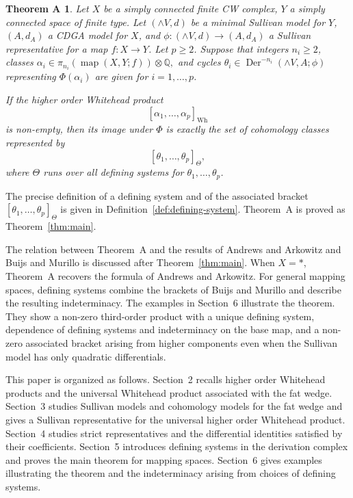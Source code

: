 \documentclass[a4paper,10pt]{amsart}
\newtheorem*{thmA}{Theorem A}
\theoremstyle{definition}
\theoremstyle{remark}
\newcommand{\map}{\operatorname{map}}
\newcommand{\Der}{\operatorname{Der}}
\numberwithin{equation}{section}
\begin{document}
\begin{thmA}
Let $X$ be a simply connected finite CW complex, $Y$ a simply connected
space of finite type. Let $(\wedge V,d)$ be a minimal Sullivan model for $Y$,
$(A,d_A)$ a CDGA model for $X$, and
$
        \phi:(\wedge V,d)\to (A,d_A)
$
a Sullivan representative for a map $f:X\to Y$.
Let $p\geq2$. Suppose that integers $n_i\geq2$, classes
$
        \alpha_i\in
        \pi_{n_i}(\map(X,Y;f))\otimes\mathbb Q,
$
and cycles
$
        \theta_i\in\Der^{-n_i}(\wedge V,A;\phi)
$
representing $\Phi(\alpha_i)$ are given for $i=1,\ldots,p$.

If the higher order Whitehead product
\[
        [\alpha_1,\ldots,\alpha_p]_{\mathrm{Wh}}
\]
is non-empty, then its image under $\Phi$ is exactly the set of cohomology
classes represented by
\[
        [\theta_1,\ldots,\theta_p]_\Theta,
\]
where $\Theta$ runs over all defining systems for
$\theta_1,\ldots,\theta_p$.
\end{thmA}

The precise definition of a defining system and of the associated bracket
$[\theta_1,\ldots,\theta_p]_\Theta$ is given in
Definition~\ref{def:defining-system}. Theorem~A is proved as
Theorem~\ref{thm:main}.

The relation between Theorem~A and the results of Andrews and Arkowitz \cite{AA1978} and Buijs and Murillo \cite{BM2008} is discussed after Theorem~\ref{thm:main}.
When $X=*$, Theorem~A recovers the formula of Andrews and Arkowitz.
For general mapping spaces, defining systems combine the brackets of Buijs and Murillo and describe the resulting indeterminacy.
The examples in Section~6 illustrate the theorem. They show a non-zero
third-order product with a unique defining system, dependence of defining
systems and indeterminacy on the base map, and a non-zero associated bracket
arising from higher components even when the Sullivan model has only quadratic
differentials.

This paper is organized as follows. 
Section~2 recalls higher order Whitehead products and the universal Whitehead product associated with the fat wedge.
Section~3 studies Sullivan models and cohomology models for the fat wedge and gives a Sullivan representative for the universal higher order Whitehead product.
Section~4 studies strict representatives and the differential identities satisfied by their coefficients.
Section~5 introduces defining systems in the derivation complex and proves the main theorem for mapping
spaces.
Section~6 gives examples illustrating the theorem and the indeterminacy arising from choices of defining systems.
\end{document}
